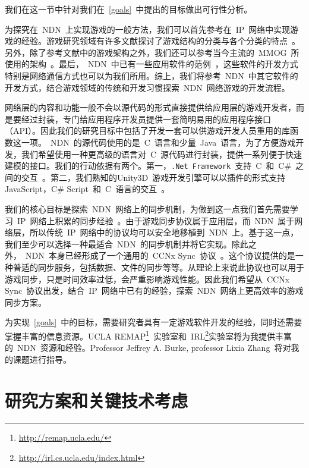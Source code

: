 我们在这一节中针对我们在~\ref{goals}~中提出的目标做出可行性分析。

为探究在~NDN~上实现游戏的一般方法，我们可以首先参考在~IP~网络中实现游戏的经验。游戏研究领域有许多文献探讨了游戏结构的分类与各个分类的特点~\cite{Ferretti2005, cr, p2p1, p2p2}。另外，除了参考文献中的游戏架构之外，我们还可以参考当今主流的~MMOG~所使用的架构~\cite{WoW, quake}。最后，~NDN~中已有一些应用软件的范例~\cite{Zact, Zhu2011, andana, vehicle, voccn}，这些软件的开发方式特别是网络通信方式也可以为我们所用。综上，我们将参考~NDN~中其它软件的开发方式，结合游戏领域的传统和开发习惯探索~NDN~网络游戏的开发流程。

网络层的内容和功能一般不会以源代码的形式直接提供给应用层的游戏开发者，而是要经过封装，专门给应用程序开发员提供一套简明易用的应用程序接口（API）。因此我们的研究目标中包括了开发一套可以供游戏开发人员重用的库函数这一项。~NDN~的源代码使用的是~C~语言和少量~Java~语言，为了方便游戏开发，我们希望使用一种更高级的语言对~C~源代码进行封装，提供一系列便于快速建模的接口。我们的行动依据有两个。第一，\verb|.Net Framework|~支持~C~和~C\#~之间的交互~\cite{interop}。第二，我们熟知的Unity3D{\tm}~游戏开发引擎可以以插件的形式支持JavaScript，C\# Script~和~C~语言的交互~\cite{plugin}。

我们的核心目标是探索~NDN~网络上的同步机制，为做到这一点我们首先需要学习~IP~网络上积累的同步经验~\cite{bryant, chandy, mimaze, hla, lockstep, fixed-bucket, Ferretti2005}。由于游戏同步协议属于应用层，而~NDN~属于网络层，所以传统~IP~网络中的协议均可以安全地移植到~NDN~上。基于这一点，我们至少可以选择一种最适合~NDN~的同步机制并将它实现。除此之外，~NDN~本身已经形成了一个通用的~CCNx Sync~协议~\cite{CCNxSync}。这个协议提供的是一种普适的同步服务，包括数据、文件的同步等等。从理论上来说此协议也可以用于游戏同步，只是时间效率过低，会严重影响游戏性能。因此我们希望从~CCNx Sync~协议出发，结合~IP~网络中已有的经验，探索~NDN~网络上更高效率的游戏同步方案。

为实现~\ref{goals}~中的目标，需要研究者具有一定游戏软件开发的经验，同时还需要掌握丰富的信息资源。UCLA REMAP\footnote{\url{http://remap.ucla.edu/}}~实验室和~IRL\footnote{\url{http://irl.cs.ucla.edu/index.html}}实验室将为我提供丰富的~NDN~资源和经验。Professor Jeffrey A. Burke, professor Lixia Zhang~将对我的课题进行指导。


\section{研究方案和关键技术考虑}

